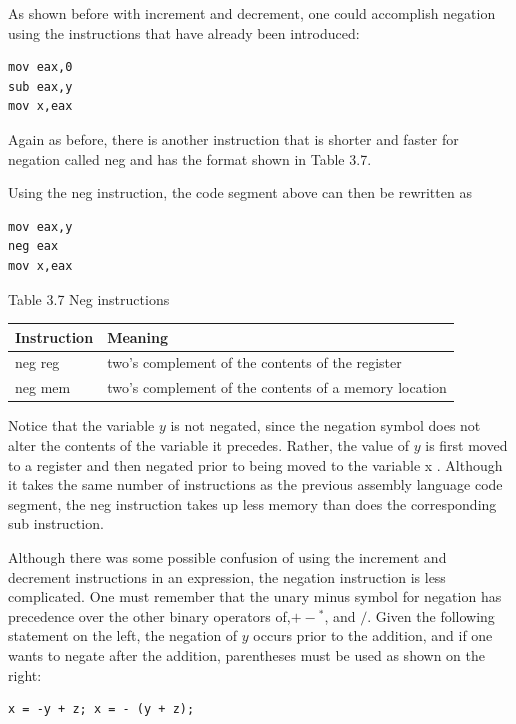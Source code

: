 \documentclass[10pt]{book}
\begin{document}
As shown before with increment and decrement, one could accomplish negation using the instructions that have already been introduced:

\begin{verbatim}
mov eax,0
sub eax,y
mov x,eax
\end{verbatim}

Again as before, there is another instruction that is shorter and faster for negation called neg and has the format shown in Table 3.7.

Using the neg instruction, the code segment above can then be rewritten as

\begin{verbatim}
mov eax,y
neg eax
mov x,eax
\end{verbatim}

Table 3.7 Neg instructions

\begin{center}
\begin{tabular}{|l|l|}
\hline
Instruction & Meaning \\
\hline
neg reg & two's complement of the contents of the register \\
\hline
neg mem & two's complement of the contents of a memory location \\
\hline
\end{tabular}
\end{center}

Notice that the variable $y$ is not negated, since the negation symbol does not alter the contents of the variable it precedes. Rather, the value of $y$ is first moved to a register and then negated prior to being moved to the variable x . Although it takes the same number of instructions as the previous assembly language code segment, the neg instruction takes up less memory than does the corresponding sub instruction.

Although there was some possible confusion of using the increment and decrement instructions in an expression, the negation instruction is less complicated. One must remember that the unary minus symbol for negation has precedence over the other binary operators of,$+-{ }^{*}$, and $/$. Given the following statement on the left, the negation of $y$ occurs prior to the addition, and if one wants to negate after the addition, parentheses must be used as shown on the right:

\begin{verbatim}
x = -y + z; x = - (y + z);
\end{verbatim}
\end{document}

